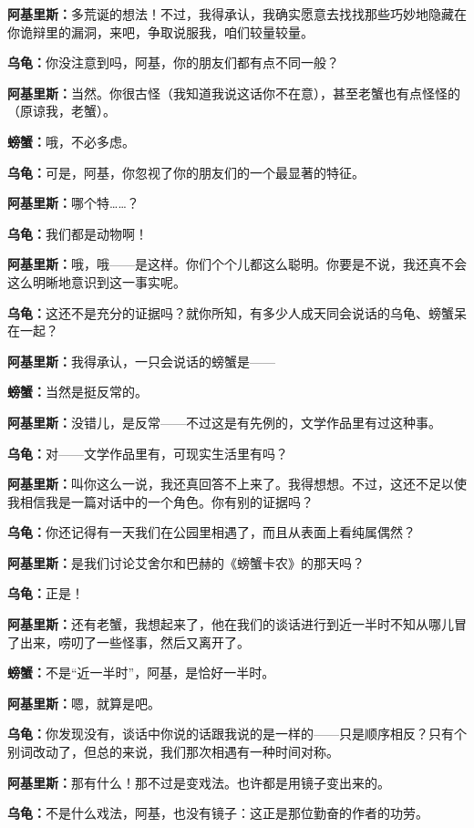 \documentclass[
  12pt,
  twoside,
  openright,
  oldfontcommands,
]{memoir}
\newcommand{\dialogname}[1]{{\sffamily\bfseries #1}}
\begin{document}
\dialogname{阿基里斯：}多荒诞的想法！不过，我得承认，我确实愿意去找找那些巧妙地隐藏在你诡辩里的漏洞，来吧，争取说服我，咱们较量较量。

\dialogname{乌龟：}你没注意到吗，阿基，你的朋友们都有点不同一般？

\dialogname{阿基里斯：}当然。你很古怪（我知道我说这话你不在意），甚至老蟹也有点怪怪的（原谅我，老蟹）。

\dialogname{螃蟹：}哦，不必多虑。

\dialogname{乌龟：}可是，阿基，你忽视了你的朋友们的一个最显著的特征。

\dialogname{阿基里斯：}哪个特\ldots\ldots？

\dialogname{乌龟：}我们都是动物啊！

\dialogname{阿基里斯：}哦，哦------是这样。你们个个儿都这么聪明。你要是不说，我还真不会这么明晰地意识到这一事实呢。

\dialogname{乌龟：}这还不是充分的证据吗？就你所知，有多少人成天同会说话的乌龟、螃蟹呆在一起？

\dialogname{阿基里斯：}我得承认，一只会说话的螃蟹是------

\dialogname{螃蟹：}当然是挺反常的。

\dialogname{阿基里斯：}没错儿，是反常------不过这是有先例的，文学作品里有过这种事。

\dialogname{乌龟：}对------文学作品里有，可现实生活里有吗？

\dialogname{阿基里斯：}叫你这么一说，我还真回答不上来了。我得想想。不过，这还不足以使我相信我是一篇对话中的一个角色。你有别的证据吗？

\dialogname{乌龟：}你还记得有一天我们在公园里相遇了，而且从表面上看纯属偶然？

\dialogname{阿基里斯：}是我们讨论艾舍尔和巴赫的《螃蟹卡农》的那天吗？

\dialogname{乌龟：}正是！

\dialogname{阿基里斯：}还有老蟹，我想起来了，他在我们的谈话进行到近一半时不知从哪儿冒了出来，唠叨了一些怪事，然后又离开了。

\dialogname{螃蟹：}不是``近一半时''，阿基，是恰好一半时。

\dialogname{阿基里斯：}嗯，就算是吧。

\dialogname{乌龟：}你发现没有，谈话中你说的话跟我说的是一样的------只是顺序相反？只有个别词改动了，但总的来说，我们那次相遇有一种时间对称。

\dialogname{阿基里斯：}那有什么！那不过是变戏法。也许都是用镜子变出来的。

\dialogname{乌龟：}不是什么戏法，阿基，也没有镜子：这正是那位勤奋的作者的功劳。
\end{document}
